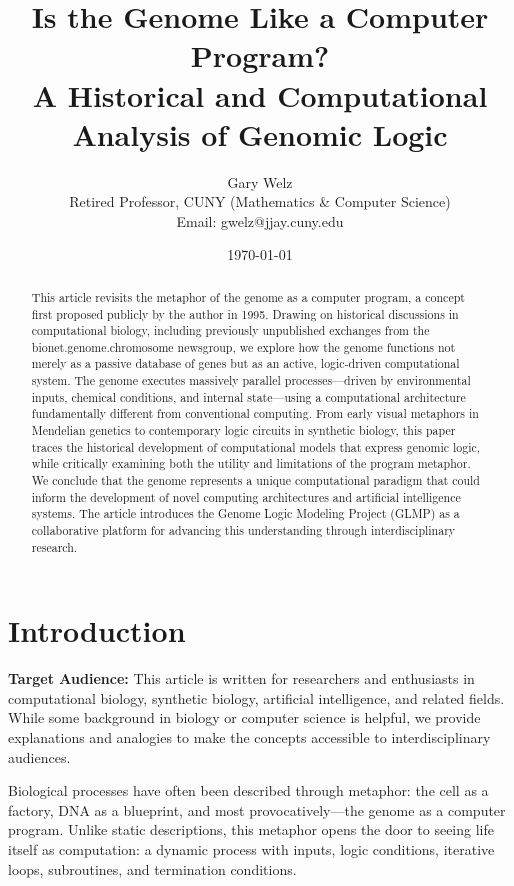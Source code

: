 \documentclass[11pt]{article}
\title{Is the Genome Like a Computer Program?\\A Historical and Computational Analysis of Genomic Logic}
\author{Gary Welz\\
\small{Retired Professor, CUNY (Mathematics \& Computer Science)}\\
\small{Email: gwelz@jjay.cuny.edu}
}
\date{\today}
\begin{document}
\maketitle

\begin{abstract}
This article revisits the metaphor of the genome as a computer program, a concept first proposed publicly by the author in 1995. Drawing on historical discussions in computational biology, including previously unpublished exchanges from the bionet.genome.chromosome newsgroup, we explore how the genome functions not merely as a passive database of genes but as an active, logic-driven computational system. The genome executes massively parallel processes—driven by environmental inputs, chemical conditions, and internal state—using a computational architecture fundamentally different from conventional computing. From early visual metaphors in Mendelian genetics to contemporary logic circuits in synthetic biology, this paper traces the historical development of computational models that express genomic logic, while critically examining both the utility and limitations of the program metaphor. We conclude that the genome represents a unique computational paradigm that could inform the development of novel computing architectures and artificial intelligence systems. The article introduces the Genome Logic Modeling Project (GLMP) as a collaborative platform for advancing this understanding through interdisciplinary research.
\end{abstract}

\section{Introduction}

\textbf{Target Audience:} This article is written for researchers and enthusiasts in computational biology, synthetic biology, artificial intelligence, and related fields. While some background in biology or computer science is helpful, we provide explanations and analogies to make the concepts accessible to interdisciplinary audiences.

Biological processes have often been described through metaphor: the cell as a factory, DNA as a blueprint, and most provocatively—the genome as a computer program. Unlike static descriptions, this metaphor opens the door to seeing life itself as computation: a dynamic process with inputs, logic conditions, iterative loops, subroutines, and termination conditions.
\end{document}
